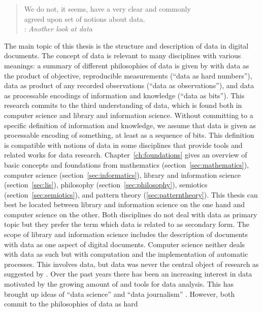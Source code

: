 \begin{quotation}%
We do not, it seems, have a very clear and commonly\\
agreed upon set of notions about data.\\
\quotationsource {} \cite*{Mealy1967}:
\textit{Another look at data}
\end{quotation}

\noindent The main topic of this thesis is the structure and description of
data in digital documents. The concept of data is relevant to many disciplines
with various meanings: a summary of different philosophies of data is given by
\textcite{BallsunStanton2010,BallsunStanton2012} with data as the product of
objective, reproducible measurements (``data as hard numbers''), data as
product of any recorded observations (``data as observations''), and data as
processable encodings of information and knowledge (``data as bits'').  This
research commits to the third understanding of data, which is found both in
computer science and library and information science.  Without committing to a
specific definition of information and knowledge, we assume that data is given
as processable encoding of something, at least as a sequence of bits. This
definition is compatible with notions of data in some disciplines that provide
tools and related works for data research. Chapter~\ref{ch:foundations} gives
an overview of basic concepts and foundations from mathematics
(section~\ref{sec:mathematics}), computer science
(section~\ref{sec:informatics}), library and information science
(section~\ref{sec:lis}), philosophy (section~\ref{sec:philosophy}), semiotics
(section~\ref{sec:semiotics}), and pattern theory (\ref{sec:patterntheory}).
This thesis can best be located between library and information science on the
one hand and computer science on the other. Both disciplines do not deal with
data as primary topic but they prefer the term  which data is
related to as secondary form. The scope of library and information science
includes the description of documents with data as one aspect of digital
documents. Computer science neither deals with data as such but with
computation and the implementation of automatic processes. This involves data,
but data was never the central object of research as suggested by
\textcite{Naur1966}. Over the past years there has been an increasing interest
in data motivated by the growing amount of  and tools for data
analysis. This has brought up ideas of ``data science'' and ``data journalism''
\cite{Bradshaw2011}. However, both commit to the philosophies of data as hard
